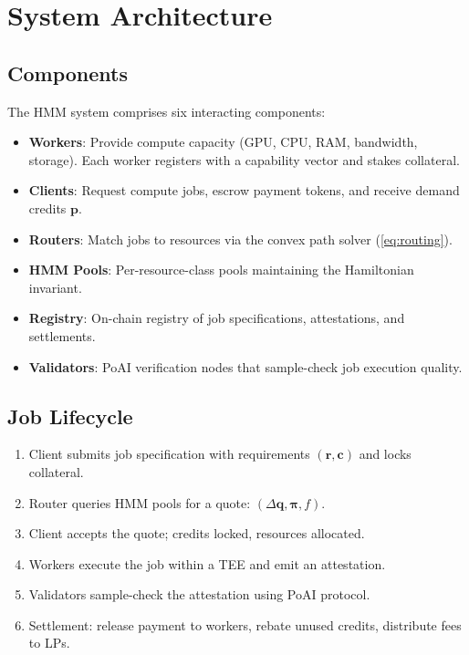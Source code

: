 \section{System Architecture}

\label{sec:architecture}

\subsection{Components}

The HMM system comprises six interacting components:

\begin{itemize}[leftmargin=1.1em]
    \item \textbf{Workers}: Provide compute capacity (GPU, CPU, RAM, bandwidth, storage). Each worker registers with a capability vector and stakes collateral.
    \item \textbf{Clients}: Request compute jobs, escrow payment tokens, and receive demand credits $\bm{p}$.
    \item \textbf{Routers}: Match jobs to resources via the convex path solver (\ref{eq:routing}).
    \item \textbf{HMM Pools}: Per-resource-class pools maintaining the Hamiltonian invariant.
    \item \textbf{Registry}: On-chain registry of job specifications, attestations, and settlements.
    \item \textbf{Validators}: PoAI verification nodes that sample-check job execution quality.
\end{itemize}

\subsection{Job Lifecycle}

\begin{enumerate}[leftmargin=1.4em]
    \item Client submits job specification with requirements $(\bm{r}, \bm{c})$ and locks collateral.
    \item Router queries HMM pools for a quote: $(\Delta\bm{q}, \bm{\pi}, f)$.
    \item Client accepts the quote; credits locked, resources allocated.
    \item Workers execute the job within a TEE and emit an attestation.
    \item Validators sample-check the attestation using PoAI protocol.
    \item Settlement: release payment to workers, rebate unused credits, distribute fees to LPs.
\end{enumerate}

